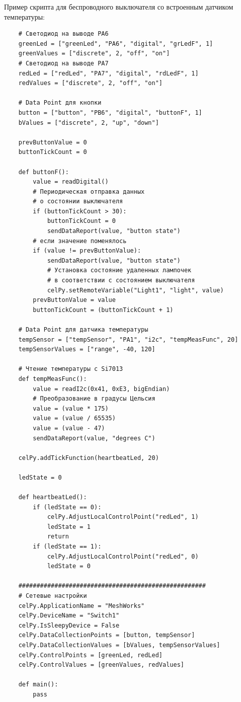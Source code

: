 \documentclass[11pt]{article}
\begin{document}
Пример скрипта для беспроводного выключателя со встроенным датчиком температуры:
\begin{verbatim}
    # Светодиод на выводе PA6 
    greenLed = ["greenLed", "PA6", "digital", "grLedF", 1]
    greenValues = ["discrete", 2, "off", "on"]
    # Светодиод на выводе PA7
    redLed = ["redLed", "PA7", "digital", "rdLedF", 1]
    redValues = ["discrete", 2, "off", "on"]
    
    # Data Point для кнопки
    button = ["button", "PB6", "digital", "buttonF", 1]
    bValues = ["discrete", 2, "up", "down"]
    
    prevButtonValue = 0
    buttonTickCount = 0
    
    def buttonF():
        value = readDigital()
        # Периодическая отправка данных
        # о состоянии выключателя
        if (buttonTickCount > 30):
            buttonTickCount = 0
            sendDataReport(value, "button state")
        # если значение поменялось
        if (value != prevButtonValue):
            sendDataReport(value, "button state")
            # Установка состояние удаленных лампочек
            # в соответствии с состоянием выключателя
            celPy.setRemoteVariable("Light1", "light", value)
        prevButtonValue = value
        buttonTickCount = (buttonTickCount + 1)
    
    # Data Point для датчика температуры
    tempSensor = ["tempSensor", "PA1", "i2c", "tempMeasFunc", 20]
    tempSensorValues = ["range", -40, 120]
    
    # Чтение температуры с Si7013
    def tempMeasFunc():
        value = readI2c(0x41, 0xE3, bigEndian)
        # Преобразование в градусы Цельсия
        value = (value * 175)
        value = (value / 65535)
        value = (value - 47)
        sendDataReport(value, "degrees C")
    
    celPy.addTickFunction(heartbeatLed, 20)
    
    ledState = 0
    
    def heartbeatLed():
        if (ledState == 0):
            celPy.AdjustLocalControlPoint("redLed", 1)
            ledState = 1
            return
        if (ledState == 1):
            celPy.AdjustLocalControlPoint("redLed", 0)
            ledState = 0
    
    ####################################################
    # Сетевые настройки
    celPy.ApplicationName = "MeshWorks"
    celPy.DeviceName = "Switch1"
    celPy.IsSleepyDevice = False
    celPy.DataCollectionPoints = [button, tempSensor]
    celPy.DataCollectionValues = [bValues, tempSensorValues]
    celPy.ControlPoints = [greenLed, redLed]
    celPy.ControlValues = [greenValues, redValues]
    
    def main():
        pass
\end{verbatim}
\end{document}
